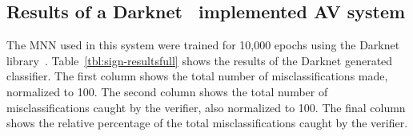 \subsection{Results of a Darknet~\cite{darknet13} implemented \ac{AV} system}
\begin{table}[h]
	\centering
	\caption{Table showing the results of the \ac{AV} prediction \ac{MNN}}
	\label{tbl:sign-resultsfull}
\end{table}

The \ac{MNN} used in this system were trained for 10,000 epochs using the Darknet library~\cite{darknet13}.
Table~\ref{tbl:sign-resultsfull} shows the results of the Darknet generated classifier.
The first column shows the total number of misclassifications made, normalized to 100.
The second column shows the total number of misclassifications caught by the verifier, also normalized to 100.
The final column shows the relative percentage of the total misclassifications caught by the verifier.

